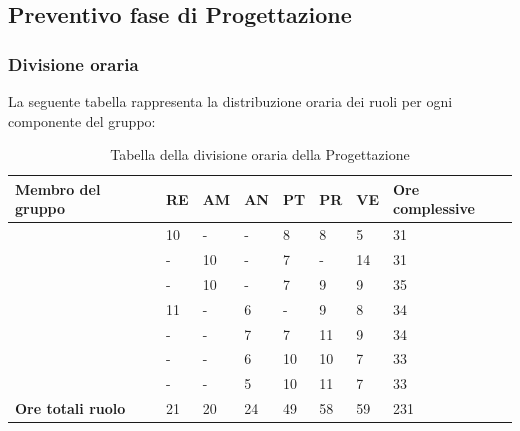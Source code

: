 \subsection{Preventivo fase di Progettazione}

\subsubsection{Divisione oraria}
La seguente tabella rappresenta la distribuzione oraria dei ruoli per ogni componente del gruppo:
\renewcommand{\arraystretch}{2}
\begin{longtable}[h!] { C{3.5cm} C{1cm} C{1cm} C{1cm} C{1cm} C{1cm} C{1cm} C{2cm}}
\caption{Tabella della divisione oraria della Progettazione}\\
\rowcolor{\primaryColor}

\textcolor{\secondaryColor}{\textbf{Membro del gruppo}} & 
\textcolor{\secondaryColor}{\textbf{RE}} & 
\textcolor{\secondaryColor}{\textbf{AM}} & 
\textcolor{\secondaryColor}{\textbf{AN}} & 
\textcolor{\secondaryColor}{\textbf{PT}} & 
\textcolor{\secondaryColor}{\textbf{PR}} & 
\textcolor{\secondaryColor}{\textbf{VE}} & 
\textcolor{\secondaryColor}{\textbf{Ore complessive}}\\	
\endhead
        
\AW{}                     & 10  & - & - & 8 & 8 & 5 & 31 \\
\AT{}                     & -  & 10 & - & 7 & - & 14 & 31 \\
\AD{}                     & -  & 10 & - & 7 & 9 & 9 & 35 \\
\EC{}                     & 11  & - & 6 & - & 9 & 8 & 34 \\
\EM{}                     & -  & - & 7 & 7 & 11 & 9 & 34 \\
\FP{}                     & -  & - & 6 & 10 & 10 & 7 & 33 \\
\GG{}                     & -  & - & 5 & 10 & 11 & 7 & 33 \\
\textbf{Ore totali ruolo} & 21 & 20 & 24 & 49 & 58 & 59 & 231 \\

		
\end{longtable}

